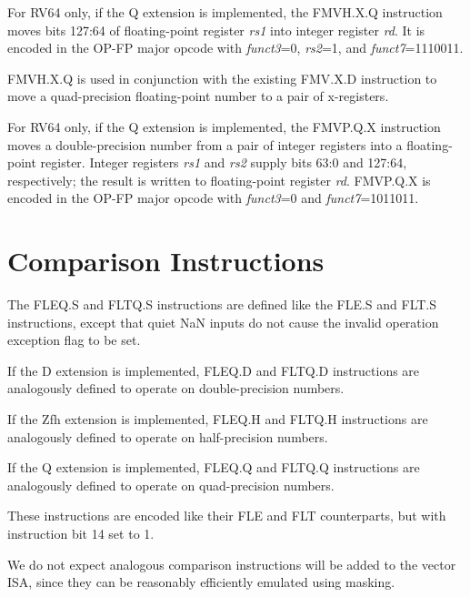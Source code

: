 For RV64 only, if the Q extension is implemented,
the FMVH.X.Q instruction moves bits 127:64 of floating-point register {\em rs1}
into integer register {\em rd}.
It is encoded in the OP-FP major opcode with {\em funct3}=0, {\em rs2}=1,
and {\em funct7}=1110011.

\begin{commentary}
FMVH.X.Q is used in conjunction with the existing FMV.X.D instruction to move
a quad-precision floating-point number to a pair of x-registers.
\end{commentary}

For RV64 only, if the Q extension is implemented,
the FMVP.Q.X instruction moves a double-precision number from a pair of integer
registers into a floating-point register.  Integer registers {\em rs1} and
{\em rs2} supply bits 63:0 and 127:64, respectively; the result is written to
floating-point register {\em rd}.
FMVP.Q.X is encoded in the OP-FP major opcode with {\em funct3}=0
and {\em funct7}=1011011.


\section{Comparison Instructions}

The FLEQ.S and FLTQ.S instructions are defined like the FLE.S and FLT.S
instructions, except that quiet NaN inputs do not cause the invalid
operation exception flag to be set.

If the D extension is implemented, FLEQ.D and FLTQ.D instructions are
analogously defined to operate on double-precision numbers.

If the Zfh extension is implemented, FLEQ.H and FLTQ.H instructions are
analogously defined to operate on half-precision numbers.

If the Q extension is implemented, FLEQ.Q and FLTQ.Q instructions are
analogously defined to operate on quad-precision numbers.

These instructions are encoded like their FLE and FLT counterparts, but
with instruction bit 14 set to 1.

\begin{commentary}
We do not expect analogous comparison instructions will be added to the vector
ISA, since they can be reasonably efficiently emulated using masking.
\end{commentary}

